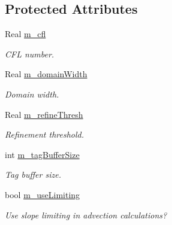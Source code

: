 \subsection*{Protected Attributes}
\begin{DoxyCompactItemize}
\item 
\hypertarget{class_a_m_r_level_mushy_layer_factory_a5ba6c44beb706a74802158e7490ac25b}{Real \hyperlink{class_a_m_r_level_mushy_layer_factory_a5ba6c44beb706a74802158e7490ac25b}{m\-\_\-cfl}}\label{class_a_m_r_level_mushy_layer_factory_a5ba6c44beb706a74802158e7490ac25b}

\begin{DoxyCompactList}\small\item\em C\-F\-L number. \end{DoxyCompactList}\item 
\hypertarget{class_a_m_r_level_mushy_layer_factory_adf85b7f5b35f914e1b31ad7aaeca5636}{Real \hyperlink{class_a_m_r_level_mushy_layer_factory_adf85b7f5b35f914e1b31ad7aaeca5636}{m\-\_\-domain\-Width}}\label{class_a_m_r_level_mushy_layer_factory_adf85b7f5b35f914e1b31ad7aaeca5636}

\begin{DoxyCompactList}\small\item\em Domain width. \end{DoxyCompactList}\item 
\hypertarget{class_a_m_r_level_mushy_layer_factory_ac2d21dd74453e56e44e1ddc52ff25afd}{Real \hyperlink{class_a_m_r_level_mushy_layer_factory_ac2d21dd74453e56e44e1ddc52ff25afd}{m\-\_\-refine\-Thresh}}\label{class_a_m_r_level_mushy_layer_factory_ac2d21dd74453e56e44e1ddc52ff25afd}

\begin{DoxyCompactList}\small\item\em Refinement threshold. \end{DoxyCompactList}\item 
\hypertarget{class_a_m_r_level_mushy_layer_factory_aa40e49179557fe927f578e5b4881790e}{int \hyperlink{class_a_m_r_level_mushy_layer_factory_aa40e49179557fe927f578e5b4881790e}{m\-\_\-tag\-Buffer\-Size}}\label{class_a_m_r_level_mushy_layer_factory_aa40e49179557fe927f578e5b4881790e}

\begin{DoxyCompactList}\small\item\em Tag buffer size. \end{DoxyCompactList}\item 
\hypertarget{class_a_m_r_level_mushy_layer_factory_a455170bf5a891c45e7647ca9f21af33a}{bool \hyperlink{class_a_m_r_level_mushy_layer_factory_a455170bf5a891c45e7647ca9f21af33a}{m\-\_\-use\-Limiting}}\label{class_a_m_r_level_mushy_layer_factory_a455170bf5a891c45e7647ca9f21af33a}

\begin{DoxyCompactList}\small\item\em Use slope limiting in advection calculations? \end{DoxyCompactList}\end{DoxyCompactItemize}


